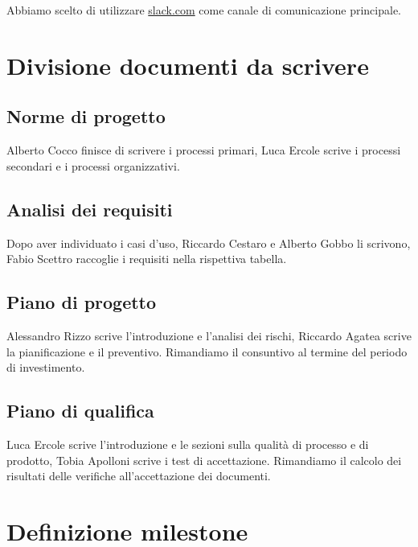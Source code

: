 \documentclass{article}
\begin{document}
Abbiamo scelto di utilizzare \href{Slack}{slack.com} come canale di comunicazione principale.

\section{Divisione documenti da scrivere}%
\label{sec:divisione_documenti_da_scrivere}

\subsection{Norme di progetto}%
\label{sub:norme_di_progetto}

Alberto Cocco finisce di scrivere i processi primari, Luca Ercole scrive i processi secondari e i processi organizzativi.

\subsection{Analisi dei requisiti}%
\label{sub:analisi_dei_requisiti}

Dopo aver individuato i casi d'uso, Riccardo Cestaro e Alberto Gobbo li scrivono, Fabio Scettro raccoglie i requisiti nella rispettiva tabella.

\subsection{Piano di progetto}%
\label{sub:piano_di_progetto}

Alessandro Rizzo scrive l'introduzione e l'analisi dei rischi, Riccardo Agatea scrive la pianificazione e il preventivo. Rimandiamo il consuntivo al termine del periodo di investimento.

\subsection{Piano di qualifica}%
\label{sub:piano_di_qualifica}
Luca Ercole scrive l'introduzione e le sezioni sulla qualità di processo e di prodotto, Tobia Apolloni scrive i test di accettazione. Rimandiamo il calcolo dei risultati delle verifiche all'accettazione dei documenti.

\section{Definizione milestone}%
\label{sec:definizione_milestone}
\end{document}
